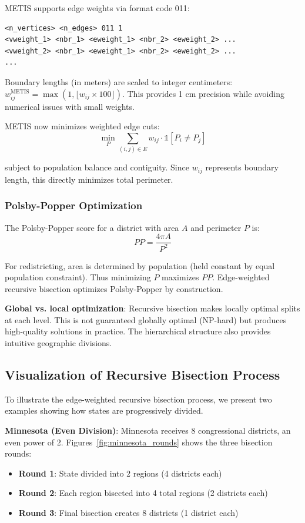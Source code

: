 METIS supports edge weights via format code 011:
\begin{verbatim}
<n_vertices> <n_edges> 011 1
<vweight_1> <nbr_1> <eweight_1> <nbr_2> <eweight_2> ...
<vweight_2> <nbr_1> <eweight_1> <nbr_2> <eweight_2> ...
...
\end{verbatim}

Boundary lengths (in meters) are scaled to integer centimeters: $w_{ij}^{\text{METIS}} = \max(1, \lfloor w_{ij} \times 100 \rfloor)$. This provides 1 cm precision while avoiding numerical issues with small weights.

METIS now minimizes weighted edge cuts:
\[
\min_{P} \sum_{(i,j) \in E} w_{ij} \cdot \mathbb{1}[P_i \neq P_j]
\]

subject to population balance and contiguity. Since $w_{ij}$ represents boundary length, this directly minimizes total perimeter.

\subsubsection{Polsby-Popper Optimization}

The Polsby-Popper score for a district with area $A$ and perimeter $P$ is:
\[
PP = \frac{4\pi A}{P^2}
\]

For redistricting, area is determined by population (held constant by equal population constraint). Thus minimizing $P$ maximizes $PP$. Edge-weighted recursive bisection optimizes Polsby-Popper by construction.

\textbf{Global vs. local optimization}: Recursive bisection makes locally optimal splits at each level. This is not guaranteed globally optimal (NP-hard) but produces high-quality solutions in practice. The hierarchical structure also provides intuitive geographic divisions.

\subsection{Visualization of Recursive Bisection Process}

To illustrate the edge-weighted recursive bisection process, we present two examples showing how states are progressively divided.

\textbf{Minnesota (Even Division)}: Minnesota receives 8 congressional districts, an even power of 2. Figures~\ref{fig:minnesota_rounds} shows the three bisection rounds:
\begin{itemize}
\item \textbf{Round 1}: State divided into 2 regions (4 districts each)
\item \textbf{Round 2}: Each region bisected into 4 total regions (2 districts each)
\item \textbf{Round 3}: Final bisection creates 8 districts (1 district each)
\end{itemize}

